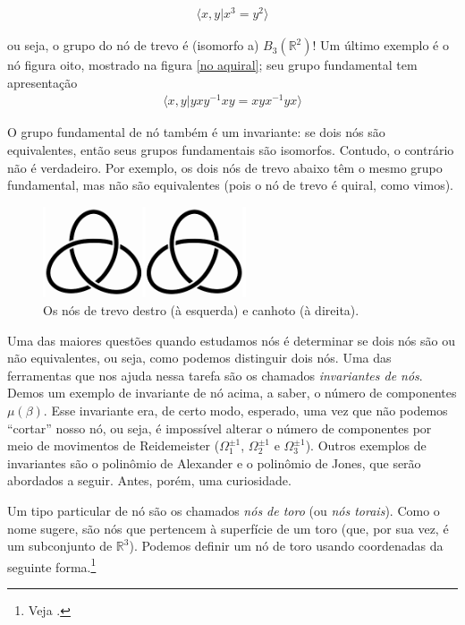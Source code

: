 	\begin{align*}
	\langle x,y|x^3 = y^2 \rangle
	\end{align*}
	\par\vspace{0.3cm} ou seja, o grupo do nó de trevo é (isomorfo a) $B_3(\mathbb{R}^2)$! Um último exemplo é o nó figura oito, mostrado na figura \eqref{no aquiral}; seu grupo fundamental tem apresentação
	\begin{align*}
	\langle x,y | yxy^{-1}xy = xyx^{-1}yx \rangle
	\end{align*}
	\par\vspace{0.3cm} O grupo fundamental de nó também é um invariante: se dois nós são equivalentes, então seus grupos fundamentais são isomorfos. Contudo, o contrário não é verdadeiro. Por exemplo, os dois nós de trevo abaixo têm o mesmo grupo fundamental, mas não são equivalentes (pois o nó de trevo é quiral, como vimos).
	
	\begin{figure}[H]
		\begin{center}
			\includegraphics[width=6cm]{Images/nos_de_trevo.png}
		\end{center}\caption{Os nós de trevo destro (à esquerda) e canhoto (à direita).}\label{nos de trevo destro e canhoto}
	\end{figure} 
	
	\par\vspace{0.3cm} Uma das maiores questões quando estudamos nós é determinar se dois nós são ou não equivalentes, ou seja, como podemos distinguir dois nós. Uma das ferramentas que nos ajuda nessa tarefa são os chamados \textit{invariantes de nós}. Demos um exemplo de invariante de nó acima, a saber, o número de componentes $\mu(\beta)$. Esse invariante era, de certo modo, esperado, uma vez que não podemos ``cortar'' nosso nó, ou seja, é impossível alterar o número de componentes por meio de movimentos de Reidemeister ($\Omega_1^{\pm1}$, $\Omega_2^{\pm1}$ e $\Omega_3^{\pm1}$). Outros exemplos de invariantes são o polinômio de Alexander e o polinômio de Jones, que serão abordados a seguir. Antes, porém, uma curiosidade.
	\par\vspace{0.3cm} Um tipo particular de nó são os chamados \textit{nós de toro} (ou \textit{nós torais}). Como o nome sugere, são nós que pertencem à superfície de um toro (que, por sua vez, é um subconjunto de $\mathbb{R}^3$). Podemos definir um nó de toro usando coordenadas da seguinte forma.\footnote{Veja \cite{no-toral}.}
	
